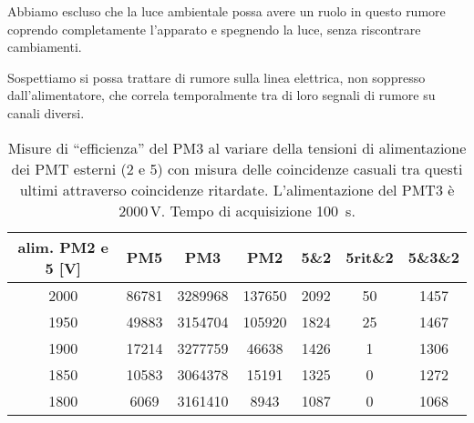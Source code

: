 Abbiamo escluso che la luce ambientale possa avere un ruolo in questo rumore coprendo completamente l'apparato e spegnendo la luce, senza riscontrare cambiamenti.

Sospettiamo si possa trattare di rumore sulla linea elettrica, non soppresso dall'alimentatore, che correla temporalmente tra di loro segnali di rumore su canali diversi.

\begin{table}
\centering
\begin{tabular}{c|c|c|c|c|c|c}
\hline
alim. PM2 e 5 [V] & PM5 & PM3 & PM2 & 5\&2 & 5rit\&2 & 5\&3\&2 \\
\hline
2000 & 86781 & 3289968 & 137650 & 2092 & 50 & 1457 \\
1950 & 49883 & 3154704 & 105920 & 1824 & 25 & 1467 \\
1900 & 17214 & 3277759 & 46638 & 1426 & 1 & 1306 \\
1850 & 10583 & 3064378 & 15191 & 1325 & 0 & 1272 \\
1800 & 6069 & 3161410 & 8943 & 1087 & 0 & 1068 \\
\hline
\end{tabular}
\caption{Misure di ``efficienza'' del PM3
al variare della tensioni di alimentazione dei PMT esterni (2 e 5)
con misura delle coincidenze casuali tra questi ultimi attraverso coincidenze ritardate.
L'alimentazione del PMT3 è 2000\,V. Tempo di acquisizione \SI{100}s.}
\label{orrore}
\end{table}